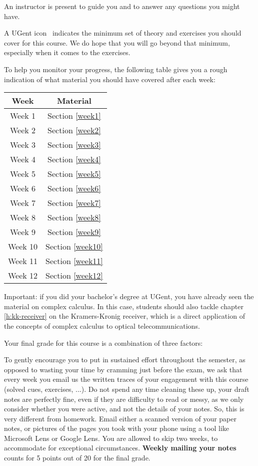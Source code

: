 An instructor is present to guide you and to answer any questions you might have.

A UGent icon \iconoffset\ugent\, indicates the minimum set of theory and exercises you should cover for this course. We do hope that you will go beyond that minimum, especially when it comes to the exercises.

To help you monitor your progress, the following table gives you a rough indication of what material you should have covered after each week:

\begin{center}
\begin{tabular}{ |c|c| } 
 \hline
  \textbf{Week} & \textbf{Material} \\
  \hline
 Week 1 & Section \ref{week1} \\ 
 Week 2 & Section \ref{week2} \\
 Week 3 & Section \ref{week3} \\
 Week 4 & Section \ref{week4} \\
 Week 5 & Section \ref{week5} \\
 Week 6 & Section \ref{week6} \\ 
 Week 7 & Section \ref{week7} \\
 Week 8 & Section \ref{week8} \\
 Week 9 & Section \ref{week9} \\
 Week 10 & Section \ref{week10}  \\
 Week 11 & Section \ref{week11} \\ 
 Week 12 & Section \ref{week12} \\
 \hline
\end{tabular}
\end{center}

Important: if you did your bachelor's degree at UGent, you have already seen the material on complex calculus. In this case, students should also tackle chapter \ref{h:kk-receiver} on the Kramers-Kronig receiver, which is a direct application of the concepts of complex calculus to optical telecommunications.

Your final grade for this course is a combination of three factors:

To gently encourage you to put in sustained effort throughout the semester, as opposed to wasting your time by cramming just before the exam, we ask that every week you email us the written traces of your engagement with this course (solved cues, exercises, ...). Do not spend any time cleaning these up, your draft notes are perfectly fine, even if they are difficulty to read or messy, as we only consider whether you were active, and not the details of your notes. So, this is very different from homework. Email either a scanned version of your paper notes, or pictures of the pages you took with your phone using a tool like Microsoft Lens or Google Lens. You are allowed to skip two weeks, to accommodate for exceptional circumstances. \textbf{Weekly mailing your notes} counts for 5 points out of 20 for the final grade.

